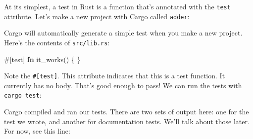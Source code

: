 \documentclass[a4paper,]{book}
\newenvironment{Shaded}{\begin{snugshade}}{\end{snugshade}}
\newcommand{\KeywordTok}[1]{\textcolor[rgb]{0.13,0.29,0.53}{\textbf{{#1}}}}
\newcommand{\AttributeTok}[1]{\textcolor[rgb]{0.77,0.63,0.00}{{#1}}}
\newcommand{\NormalTok}[1]{{#1}}
\begin{document}
At its simplest, a test in Rust is a function that's annotated with the
\texttt{test} attribute. Let's make a new project with Cargo called
\texttt{adder}:

\begin{Shaded}
\end{Shaded}

Cargo will automatically generate a simple test when you make a new
project. Here's the contents of \texttt{src/lib.rs}:

\begin{Shaded}
\begin{Highlighting}[]
\AttributeTok{#[}\NormalTok{test}\AttributeTok{]}
\KeywordTok{fn} \NormalTok{it_works() \{}
\NormalTok{\}}
\end{Highlighting}
\end{Shaded}

Note the \texttt{\#{[}test{]}}. This attribute indicates that this is a
test function. It currently has no body. That's good enough to pass! We
can run the tests with \texttt{cargo\ test}:

\begin{Shaded}
\end{Shaded}

Cargo compiled and ran our tests. There are two sets of output here: one
for the test we wrote, and another for documentation tests. We'll talk
about those later. For now, see this line:
\end{document}
